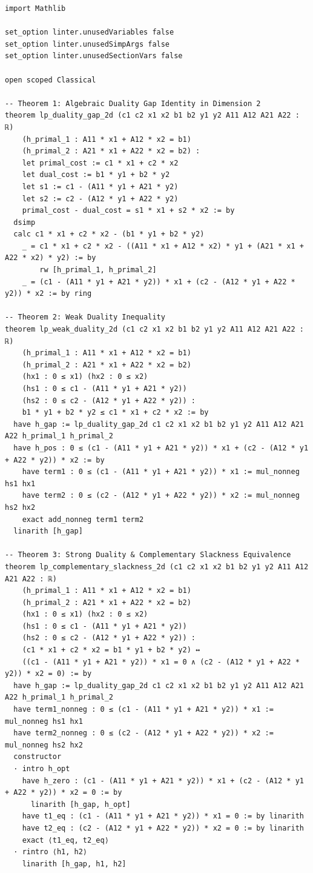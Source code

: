 \documentclass[11pt,a4paper]{article}
\theoremstyle{definition}
\begin{document}
\begin{lstlisting}[caption={Formal Lean 4 Verification of LP Duality and Invariants}]
import Mathlib

set_option linter.unusedVariables false
set_option linter.unusedSimpArgs false
set_option linter.unusedSectionVars false

open scoped Classical

-- Theorem 1: Algebraic Duality Gap Identity in Dimension 2
theorem lp_duality_gap_2d (c1 c2 x1 x2 b1 b2 y1 y2 A11 A12 A21 A22 : ℝ)
    (h_primal_1 : A11 * x1 + A12 * x2 = b1)
    (h_primal_2 : A21 * x1 + A22 * x2 = b2) :
    let primal_cost := c1 * x1 + c2 * x2
    let dual_cost := b1 * y1 + b2 * y2
    let s1 := c1 - (A11 * y1 + A21 * y2)
    let s2 := c2 - (A12 * y1 + A22 * y2)
    primal_cost - dual_cost = s1 * x1 + s2 * x2 := by
  dsimp
  calc c1 * x1 + c2 * x2 - (b1 * y1 + b2 * y2)
    _ = c1 * x1 + c2 * x2 - ((A11 * x1 + A12 * x2) * y1 + (A21 * x1 + A22 * x2) * y2) := by
        rw [h_primal_1, h_primal_2]
    _ = (c1 - (A11 * y1 + A21 * y2)) * x1 + (c2 - (A12 * y1 + A22 * y2)) * x2 := by ring

-- Theorem 2: Weak Duality Inequality
theorem lp_weak_duality_2d (c1 c2 x1 x2 b1 b2 y1 y2 A11 A12 A21 A22 : ℝ)
    (h_primal_1 : A11 * x1 + A12 * x2 = b1)
    (h_primal_2 : A21 * x1 + A22 * x2 = b2)
    (hx1 : 0 ≤ x1) (hx2 : 0 ≤ x2)
    (hs1 : 0 ≤ c1 - (A11 * y1 + A21 * y2))
    (hs2 : 0 ≤ c2 - (A12 * y1 + A22 * y2)) :
    b1 * y1 + b2 * y2 ≤ c1 * x1 + c2 * x2 := by
  have h_gap := lp_duality_gap_2d c1 c2 x1 x2 b1 b2 y1 y2 A11 A12 A21 A22 h_primal_1 h_primal_2
  have h_pos : 0 ≤ (c1 - (A11 * y1 + A21 * y2)) * x1 + (c2 - (A12 * y1 + A22 * y2)) * x2 := by
    have term1 : 0 ≤ (c1 - (A11 * y1 + A21 * y2)) * x1 := mul_nonneg hs1 hx1
    have term2 : 0 ≤ (c2 - (A12 * y1 + A22 * y2)) * x2 := mul_nonneg hs2 hx2
    exact add_nonneg term1 term2
  linarith [h_gap]

-- Theorem 3: Strong Duality & Complementary Slackness Equivalence
theorem lp_complementary_slackness_2d (c1 c2 x1 x2 b1 b2 y1 y2 A11 A12 A21 A22 : ℝ)
    (h_primal_1 : A11 * x1 + A12 * x2 = b1)
    (h_primal_2 : A21 * x1 + A22 * x2 = b2)
    (hx1 : 0 ≤ x1) (hx2 : 0 ≤ x2)
    (hs1 : 0 ≤ c1 - (A11 * y1 + A21 * y2))
    (hs2 : 0 ≤ c2 - (A12 * y1 + A22 * y2)) :
    (c1 * x1 + c2 * x2 = b1 * y1 + b2 * y2) ↔
    ((c1 - (A11 * y1 + A21 * y2)) * x1 = 0 ∧ (c2 - (A12 * y1 + A22 * y2)) * x2 = 0) := by
  have h_gap := lp_duality_gap_2d c1 c2 x1 x2 b1 b2 y1 y2 A11 A12 A21 A22 h_primal_1 h_primal_2
  have term1_nonneg : 0 ≤ (c1 - (A11 * y1 + A21 * y2)) * x1 := mul_nonneg hs1 hx1
  have term2_nonneg : 0 ≤ (c2 - (A12 * y1 + A22 * y2)) * x2 := mul_nonneg hs2 hx2
  constructor
  · intro h_opt
    have h_zero : (c1 - (A11 * y1 + A21 * y2)) * x1 + (c2 - (A12 * y1 + A22 * y2)) * x2 = 0 := by
      linarith [h_gap, h_opt]
    have t1_eq : (c1 - (A11 * y1 + A21 * y2)) * x1 = 0 := by linarith
    have t2_eq : (c2 - (A12 * y1 + A22 * y2)) * x2 = 0 := by linarith
    exact ⟨t1_eq, t2_eq⟩
  · rintro ⟨h1, h2⟩
    linarith [h_gap, h1, h2]


\end{lstlisting}
\end{document}
